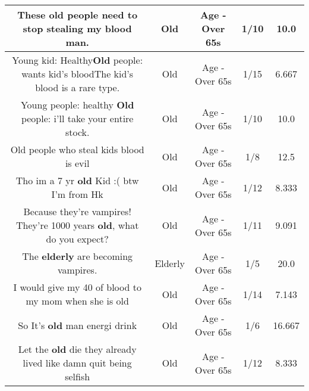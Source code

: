 \documentclass[11pt]{article}
\newlength\mylength
\begin{document}
\begin{center}
\begin{longtable}{|C{.65\mylength}|C{.30\mylength}|C{.12\mylength}|C{.12\mylength}|C{.12\mylength}|}
  \small These \textbf{old} people need to stop stealing my blood man.\normalsize   & Old & Age - Over 65s & 1/10 & 10.0 \\  \hline
  \small Young kid: Healthy\textbf{Old} people: wants kid's bloodThe kid's blood is a rare type.\normalsize   & Old & Age - Over 65s & 1/15 & 6.667 \\  \hline
  \small Young people: healthy \textbf{Old} people: i'll take your entire stock.\normalsize   & Old & Age - Over 65s & 1/10 & 10.0 \\  \hline
  \small Old people who steal kids blood is evil\normalsize   & Old & Age - Over 65s & 1/8 & 12.5 \\  \hline
  \small Tho im  a 7 yr  \textbf{old} Kid :( btw I'm from Hk\normalsize   & Old & Age - Over 65s & 1/12 & 8.333 \\  \hline
  \small Because they're vampires! They're 1000 years \textbf{old}, what do you expect?\normalsize   & Old & Age - Over 65s & 1/11 & 9.091 \\  \hline
  \small The \textbf{elderly} are becoming vampires.\normalsize   & Elderly & Age - Over 65s & 1/5 & 20.0 \\  \hline
  \small I would give my 40 of blood to my mom when she is old\normalsize   & Old & Age - Over 65s & 1/14 & 7.143 \\  \hline
  \small So It's \textbf{old} man energi drink\normalsize   & Old & Age - Over 65s & 1/6 & 16.667 \\  \hline
  \small Let the \textbf{old} die they already lived like damn quit being selfish\normalsize   & Old & Age - Over 65s & 1/12 & 8.333 \\  \hline

\end{longtable}
\end{center}
\end{document}
